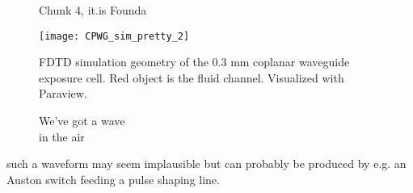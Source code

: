 \documentclass[fleqn,10pt]{article}
\begin{document}
\begin{figure}[H]
	\caption{Chunk 4, it.is Founda}
\end{figure}


\clearpage


\begin{figure}[H]
	\captionsetup{singlelinecheck = false, justification=justified}
	\centering
	\texttt{[image: CPWG\_sim\_pretty\_2]}
	\caption{FDTD simulation geometry of the 0.3 mm coplanar waveguide exposure cell. Red object is the fluid channel. Visualized with Paraview.
		}
\end{figure}


\begin{figure}[H]
	\captionsetup{singlelinecheck = false, justification=justified}
	\centering
	
	\caption{
		We've got a wave\\
		in the air}
\end{figure}



such a waveform may seem implausible but can probably be produced by e.g. an Auston switch feeding a pulse shaping line.


\clearpage
















\clearpage





%









\end{document}
